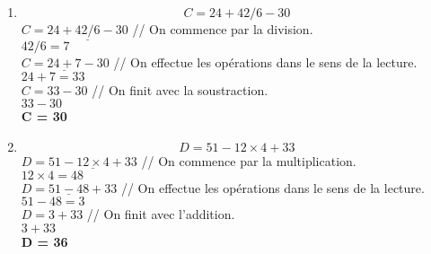 \documentclass[11pt]{article}
\begin{document}
\begin{enumerate}
\item $$C = 24 + 42 /6 - 30 $$
  $C = 24 +  \underline{42 /6} - 30 $ // On commence par la division.\\
  $42 / 6 = 7$\\
  $C =  \underline{24 + 7} - 30 $ // On effectue les opérations dans le sens de la lecture.\\
  $24 + 7 = 33$\\
  $C = 33 - 30$ // On finit avec la soustraction.\\
  $33 - 30$\\
  \textbf{C = 30}\\
  

\item $$D = 51 - 12 \times 4 + 33 $$
  $D = 51 - \underline{12 \times 4} + 33 $ // On commence par la multiplication.\\
  $12 \times 4 = 48$\\
  $D = \underline{51 - 48} + 33 $ // On effectue les opérations dans le sens de la lecture.\\
  $51 - 48 = 3$\\
  $D = 3 + 33$ // On finit avec l'addition.\\
  $3 + 33$\\
  \textbf{D = 36}\\
\end{enumerate}
\end{document}

